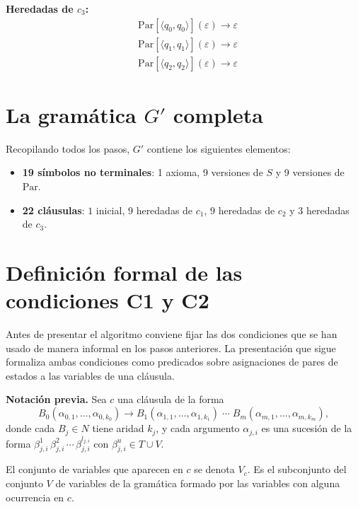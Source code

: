 \documentclass[11pt, letterpaper]{article}
\theoremstyle{definition}
\newcommand{\eps}{\varepsilon}
\newcommand{\pair}[2]{\langle #1, #2 \rangle}
\newcommand{\Par}{\mathrm{Par}}
\begin{document}
\begin{tcolorbox}[colback=green!10, colframe=green!50!black]
\textbf{Heredadas de $c_3$:}
\begin{align*}
& \Par[\pair{q_0}{q_0}](\eps) \to \eps \\
& \Par[\pair{q_1}{q_1}](\eps) \to \eps \\
& \Par[\pair{q_2}{q_2}](\eps) \to \eps
\end{align*}
\end{tcolorbox}

\section{La gramática $G'$ completa}

Recopilando todos los pasos, $G'$ contiene los siguientes elementos:

\begin{itemize}
\item \textbf{19 símbolos no terminales}: 1 axioma, 9 versiones de $S$ y 9 versiones de $\Par$.
\item \textbf{22 cláusulas}: $1$ inicial, $9$ heredadas de $c_1$, $9$ heredadas de $c_2$ y $3$ heredadas de $c_3$.
\end{itemize}

\section{Definición formal de las condiciones C1 y C2}

Antes de presentar el algoritmo conviene fijar las dos condiciones que se han usado de manera informal en los pasos anteriores. La presentación que sigue formaliza ambas condiciones como predicados sobre asignaciones de pares de estados a las variables de una cláusula.

\textbf{Notación previa.} Sea $c$ una cláusula de la forma
\[
B_0(\alpha_{0,1}, \dots, \alpha_{0, k_0}) \to B_1(\alpha_{1,1}, \dots, \alpha_{1, k_1}) \; \cdots \; B_m(\alpha_{m,1}, \dots, \alpha_{m, k_m}),
\]
donde cada $B_j \in N$ tiene aridad $k_j$, y cada argumento $\alpha_{j,i}$ es una sucesión de la forma $\beta_{j,i}^{1} \, \beta_{j,i}^{2} \, \cdots \, \beta_{j,i}^{l_{j,i}}$ con $\beta_{j,i}^{u} \in T \cup V$.

El conjunto de variables que aparecen en $c$ se denota $V_c$. Es el subconjunto del conjunto $V$ de variables de la gramática formado por las variables con alguna ocurrencia en $c$.
\end{document}
